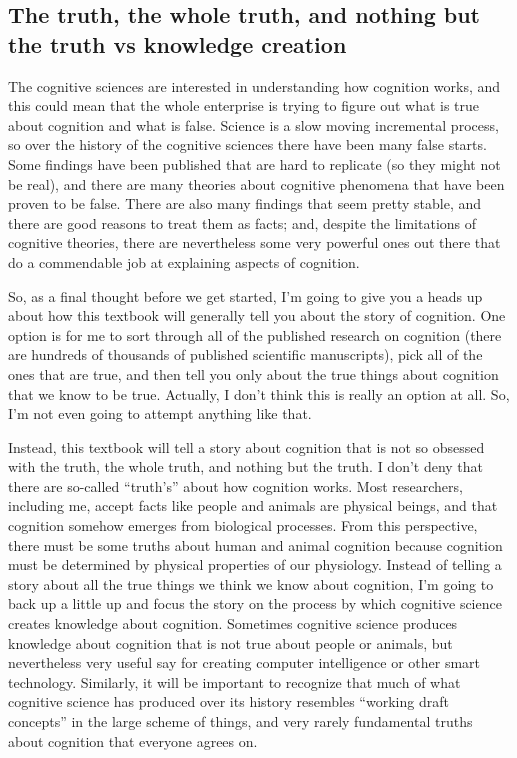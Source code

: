 \documentclass[
  oneside,
  12pt]{crumpbook}
\begin{document}
\hypertarget{the-truth-the-whole-truth-and-nothing-but-the-truth-vs-knowledge-creation}{%
\subsection{The truth, the whole truth, and nothing but the truth vs knowledge creation}\label{the-truth-the-whole-truth-and-nothing-but-the-truth-vs-knowledge-creation}}

The cognitive sciences are interested in understanding how cognition works, and this could mean that the whole enterprise is trying to figure out what is true about cognition and what is false. Science is a slow moving incremental process, so over the history of the cognitive sciences there have been many false starts. Some findings have been published that are hard to replicate (so they might not be real), and there are many theories about cognitive phenomena that have been proven to be false. There are also many findings that seem pretty stable, and there are good reasons to treat them as facts; and, despite the limitations of cognitive theories, there are nevertheless some very powerful ones out there that do a commendable job at explaining aspects of cognition.

So, as a final thought before we get started, I'm going to give you a heads up about how this textbook will generally tell you about the story of cognition. One option is for me to sort through all of the published research on cognition (there are hundreds of thousands of published scientific manuscripts), pick all of the ones that are true, and then tell you only about the true things about cognition that we know to be true. Actually, I don't think this is really an option at all. So, I'm not even going to attempt anything like that.

Instead, this textbook will tell a story about cognition that is not so obsessed with the truth, the whole truth, and nothing but the truth. I don't deny that there are so-called ``truth's'' about how cognition works. Most researchers, including me, accept facts like people and animals are physical beings, and that cognition somehow emerges from biological processes. From this perspective, there must be some truths about human and animal cognition because cognition must be determined by physical properties of our physiology. Instead of telling a story about all the true things we think we know about cognition, I'm going to back up a little up and focus the story on the process by which cognitive science creates knowledge about cognition. Sometimes cognitive science produces knowledge about cognition that is not true about people or animals, but nevertheless very useful say for creating computer intelligence or other smart technology. Similarly, it will be important to recognize that much of what cognitive science has produced over its history resembles ``working draft concepts'' in the large scheme of things, and very rarely fundamental truths about cognition that everyone agrees on.
\end{document}
